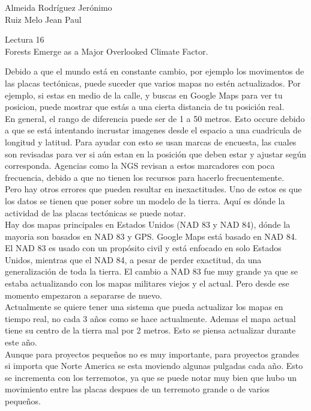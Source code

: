 \documentclass[a4paper, 12pt]{report}
\begin{document}
\begin{flushright}
    Almeida Rodríguez Jerónimo\\
    Ruiz Melo Jean Paul
\end{flushright}

\begin{center}
    {\LARGE Lectura 16}\\
    {\LARGE Forests Emerge as a Major Overlooked Climate Factor.}
\end{center}
Debido a que el mundo está en constante cambio, por ejemplo los movimentos de las placas tectónicas,
puede suceder que varios mapas no estén actualizados. Por ejemplo, si estas en medio
de la calle, y buscas en Google Maps para ver tu posicion, puede mostrar que estás
a una cierta distancia de tu posición real.\\

En general, el rango de diferencia puede ser de 1 a 50 metros. Esto occure debido a que se
está intentando incrustar imagenes desde el espacio a una cuadricula de longitud y latitud. Para ayudar
con esto se usan marcas de encuesta, las cuales son revisadas para ver si aún estan en
la posición que deben estar y ajustar según corresponda. Agencias como la NGS revisan a estos marcadores con poca frecuencia, debido a que no tienen los recursos para
hacerlo frecuentemente.\\

Pero hay otros errores que pueden resultar en inexactitudes. Uno de estos
es que los datos se tienen que poner sobre un modelo de la tierra. Aquí es dónde la actividad
de las placas
tectónicas se puede notar.\\

Hay dos mapas principales en Estados Unidos (NAD 83 y NAD 84), dónde la mayoria
son basados en NAD 83 y GPS. Google Maps está basado en NAD 84. El NAD 83 es usado con un propósito civil y está enfocado en solo Estados Unidos, mientras que
el NAD 84, a pesar de perder exactitud, da una generalización de toda la tierra.
El cambio a NAD 83 fue muy grande ya que se estaba actualizando con los mapas militares viejos y el actual. Pero
desde ese momento empezaron a separarse de nuevo. \\

Actualmente se quiere tener una sistema que pueda actualizar los mapas en tiempo real,
no cada 3 años como se hace actualmente. Ademas el mapa actual tiene su centro de la
tierra mal por 2 metros. Esto se piensa actualizar durante este año. \\

Aunque para proyectos pequeños no es muy importante, para proyectos grandes si importa que
Norte America se esta moviendo algunas pulgadas cada año. Esto se incrementa con los
terremotos, ya que se puede notar muy bien que hubo un movimiento entre las placas
despues de un terremoto grande o de varios pequeños.
\end{document}
